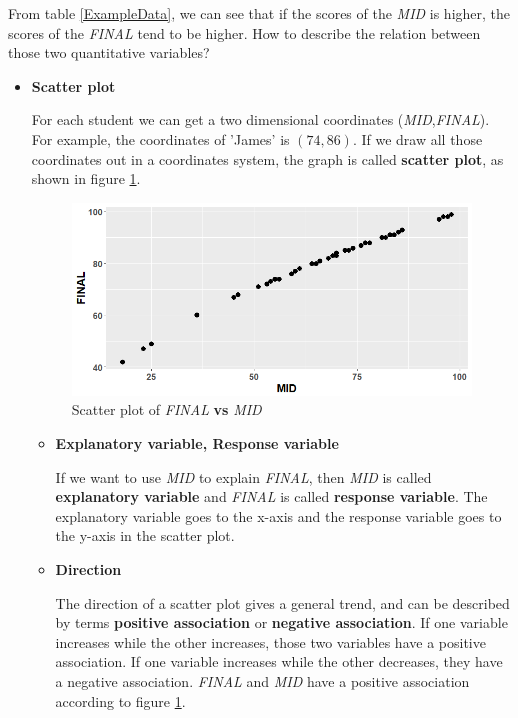 \documentclass[a4paper, 12pt,twoside]{book}
\begin{document}
\begin{itemize}
From table \ref{ExampleData}, we can see that if the scores of the \textit{MID} is higher, the scores of the \textit{FINAL} tend to be higher. How to describe the relation between those two quantitative variables?

\begin{itemize}
 \item \textbf{Scatter plot}
 \vspace{0.6cm}
 
 For each student we can get a two dimensional coordinates (\textit{MID},\textit{FINAL}). For example, the coordinates of 'James' is $(74, 86)$. If we draw all those coordinates out in a coordinates system, the graph is called \textbf{scatter plot}, as shown in figure \ref{ScatterPlot}.
 
 \begin{figure}[H]
\centering
\includegraphics[scale=0.5]{ScatterPlot.png}
\caption{Scatter plot of \textit{FINAL} \textbf{vs} \textit{MID}}
\label{ScatterPlot}
\end{figure}

\begin{itemize}
 \item \textbf{Explanatory variable, Response variable}
 \vspace{0.6cm}
 
 If we want to use \textit{MID} to explain \textit{FINAL}, then \textit{MID} is called \textbf{explanatory variable} and \textit{FINAL} is called \textbf{response variable}. The explanatory variable goes to the x-axis and the response variable goes to the y-axis in the scatter plot.
 \vspace{0.6cm}
 
 \item \textbf{Direction}
 \vspace{0.6cm}
 
 The direction of a scatter plot gives a general trend, and can be described by terms \textbf{positive association} or \textbf{negative association}. If one variable increases while the other increases, those two variables have a positive association. If one variable increases while the other decreases, they have a negative association. \textit{FINAL} and \textit{MID} have a positive association according to figure \ref{ScatterPlot}.
 

\end{itemize}
\end{itemize}
\end{itemize}
\end{document}
